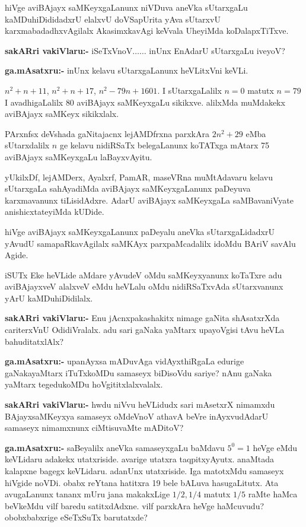 hiVge aviBAjayx saMKeyxgaLanunx niVDuva aneVka sUtarxgaLu kaMDuhiDididadxrU elalxvU doVSapUrita yAva sUtarxvU karxmabadadhxvAgilalx AkasimxkavAgi keVvala UheyiMda koDalapxTiTxve.

\smallskip
\noindent
\textbf{sakARri vakiVlaru:-} iSeTxVnoV$\ldots\ldots$ inUnx EnAdarU sUtarxgaLu iveyoV?

\smallskip
\noindent
\textbf{ga.mAsatxru:-} inUnx kelavu sUtarxgaLanunx heVLitxVni keVLi.

$n^2+n+11$, $n^2+n+17$, $n^2-79n+1601$. I sUtarxgaLalilx $n=0$ matutx $n=79$ I avadhigaLalilx {\rm 80} aviBAjayx saMKeyxgaLu sikikxve. alilxMda muMdakekx aviBAjayx saMKeyx sikikxlalx.

PArxnfsx deVshada gaNitajacnx lejAMDfrxna parxkAra $2n^2+29$ eMba sUtarxdalilx $n$ ge kelavu nidiRSaTx belegaLanunx koTATxga mAtarx {\rm 75} aviBAjayx saMKeyxgaLu laBayxvAyitu.

yUkilxDf, lejAMDerx, Ayalxrf, PamAR, maseVRna muMtAdavaru kelavu sUtarxgaLa sahAyadiMda aviBAjayx saMKeyxgaLanunx paDeyuva karxmavanunx tiLisidAdxre. AdarU aviBAjayx saMKeyxgaLa saMBavaniVyate anishicxtateyiMda kUDide.

hiVge aviBAjayx saMKeyxgaLanunx paDeyalu aneVka sUtarxgaLidadxrU yAvudU samapaRkavAgilalx saMKAyx parxpaMcadalilx idoMdu BAriV savAlu Agide. 

iSUTx Eke heVLide aMdare yAvudeV oMdu saMKeyxyanunx koTaTxre adu aviBAjayxveV alalxveV eMdu heVLalu oMdu nidiRSaTxvAda sUtarxvanunx yArU kaMDuhiDidilalx.

\smallskip
\noindent
\textbf{sakARri vakiVlaru:-} Enu jAcnxpakashakitx nimage gaNita shAsatxrXda cariterxVnU OdidiVralalx. adu sari gaNaka yaMtarx upayoVgisi tAvu heVLa bahuditatxlAlx?

\smallskip
\noindent
\textbf{ga.mAsatxru:-} upanAyxsa mADuvAga vidAyxthiRgaLa edurige gaNakayaMtarx iTuTxkoMDu samaseyx biDisoVdu sariye? nAnu gaNaka yaMtarx tegedukoMDu hoVgititxlalxvalalx.

\smallskip
\noindent
\textbf{sakARri vakiVlaru:-} hwdu niVvu heVLidudx sari mAsetxrX nimamxdu BAjayxsaMKeyxya samaseyx oMdeVnoV athavA beVre inAyxvudAdarU samaseyx nimamxnunx ciMtisuvaMte mADitoV?

\smallskip
\noindent
\textbf{ga.mAsatxru:-} saBeyalilx aneVka samaseyxgaLu baMdavu $5^0=1$ heVge eMdu keVLidaru adakekx utatxriside. avarige utatxra taqpitxyAyutx. anaMtada kalapxne bagegx keVLidaru. adanUnx utatxriside. Iga matotxMdu samaseyx hiVgide noVDi. obabx reYtana hatitxra {\rm 19} bele bALuva hasugaLitutx. Ata avugaLanunx tananx mUru jana makakxLige $1/2, 1/4$ matutx $1/5$ raMte haMca beVkeMdu vilf baredu satitxdAdxne. vilf parxkAra heVge haMcuvudu? obobxbabxrige eSeTxSuTx barutatxde?

